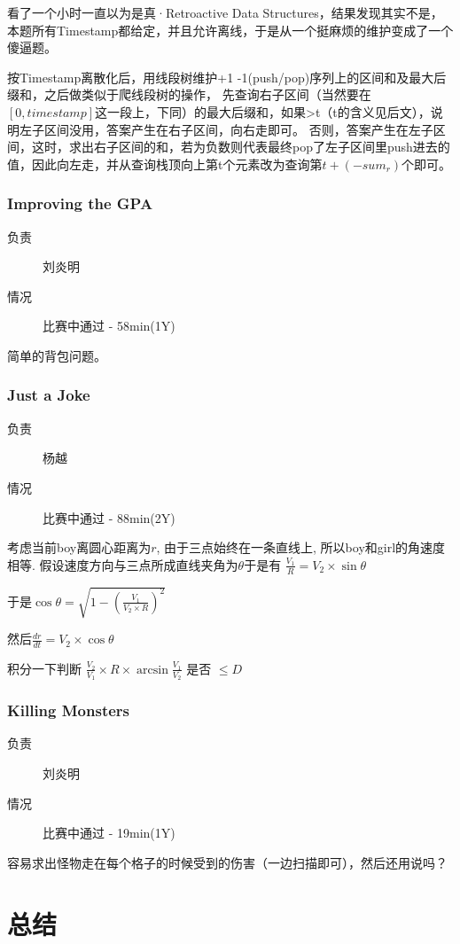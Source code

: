 \documentclass[a4paper, 11pt, nofonts, nocap, fancyhdr]{ctexart}
\newcommand{\problem}[1]{\subsubsection{#1}}
\begin{document}
看了一个小时一直以为是真·Retroactive Data Structures，结果发现其实不是，本题所有Timestamp都给定，并且允许离线，于是从一个挺麻烦的维护变成了一个傻逼题。

按Timestamp离散化后，用线段树维护+1 -1(push/pop)序列上的区间和及最大后缀和，之后做类似于爬线段树的操作，
先查询右子区间（当然要在$[0,timestamp]$这一段上，下同）的最大后缀和，如果>t（t的含义见后文），说明左子区间没用，答案产生在右子区间，向右走即可。
否则，答案产生在左子区间，这时，求出右子区间的和，若为负数则代表最终pop了左子区间里push进去的值，因此向左走，并从查询栈顶向上第t个元素改为查询第$t + (-sum_r)$个即可。

\problem{Improving the GPA}

\begin{description}
\item[负责] 刘炎明
\item[情况] 比赛中通过 - 58min(1Y)
\end{description}

简单的背包问题。

\problem{Just a Joke}

\begin{description}
\item[负责] 杨越
\item[情况] 比赛中通过 - 88min(2Y)
\end{description}

考虑当前boy离圆心距离为$r$, 由于三点始终在一条直线上, 所以boy和girl的角速度相等. 假设速度方向与三点所成直线夹角为$\theta$于是有 $ \frac{V_1}{R} = V_2 \times \sin\theta$

于是$\cos\theta = \sqrt{1-(\frac{V_1}{V_2 \times R})^2} $

然后$\frac{dr}{dt} = V_2 \times \cos\theta$

积分一下判断 $ \frac{V_2}{V_1} \times R \times \arcsin\frac{V_1}{V_2}$ 是否 $\leq D$

\problem{Killing Monsters}

\begin{description}
\item[负责] 刘炎明
\item[情况] 比赛中通过 - 19min(1Y)
\end{description}

容易求出怪物走在每个格子的时候受到的伤害（一边扫描即可），然后还用说吗？

\section{总结}
\end{document}
